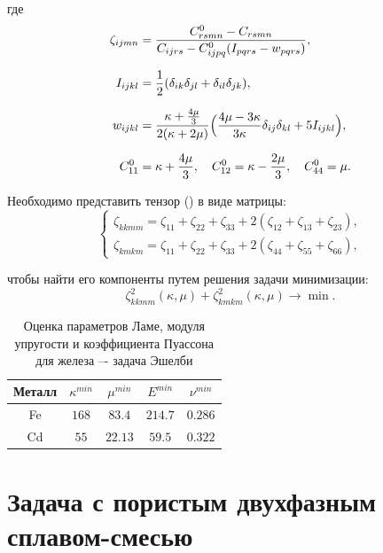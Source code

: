 \documentclass[12pt,a4paper]{article}
\begin{document}
\noindent где 
\begin{gather*}
    \begin{split}
        \zeta_{ijmn} &= \dfrac{C_{rsmn}^0 - C_{rsmn}}{C_{ijrs} - C_{ijpq}^0 (I_{pqrs} - w_{pqrs})}, \\[0.7em]
        I_{ijkl} &= \dfrac{1}{2}(\delta_{ik} \delta_{jl} + \delta_{il} \delta_{jk}), \\[0.7em]
        w_{ijkl} &= \dfrac{\kappa + \frac{4 \mu}{3}}{2(\kappa + 2\mu)} \Bigl(\dfrac{4 \mu - 3\kappa}{3 \kappa} \delta_{ij} \delta_{kl} + 5 I_{ijkl} \Bigr), \\[0.7em]
        C^0_{11} &= \kappa + \dfrac{4 \mu}{3}, \quad C^0_{12} = \kappa - \dfrac{2\mu}{3}, \quad C^0_{44} = \mu.
    \end{split}
\end{gather*}

Необходимо представить тензор () в виде матрицы:
\[
    \begin{cases}
        \zeta_{kkmm} = \zeta_{11} + \zeta_{22} + \zeta_{33} + 2(\zeta_{12} + \zeta_{13} + \zeta_{23}), \\
        \zeta_{kmkm} = \zeta_{11} + \zeta_{22} + \zeta_{33} + 2(\zeta_{44} + \zeta_{55} + \zeta_{66}),
    \end{cases}  
\]

\noindent чтобы найти его компоненты путем решения задачи минимизации:
\begin{equation}
    \zeta^2_{kkmm}(\kappa, \mu) + \zeta^2_{kmkm}(\kappa, \mu) \rightarrow \min.
    \label{eq:min}    
\end{equation}

\pagebreak

\begin{table}[h!]
    \centering
    \caption{Оценка параметров Ламе, модуля упругости и коэффициента Пуассона для железа –- задача Эшелби}
    \vspace{3mm}
    \begin{tabular}{|c|c|c|c|c|}
        \hline 
        Металл & $ \kappa^{min}$ & $\mu^{min}$ & $E^{min}$ & $\nu^{min}$ \\
        \hline 
        Fe & $168$ & $83.4$ & $214.7$ & $0.286$ \\
        \hline
        Cd & $55$ & $22.13$ & $59.5$ & $0.322$ \\
        \hline 
    \end{tabular}
 \end{table}

 \section{Задача с пористым двухфазным сплавом-смесью}
\end{document}
